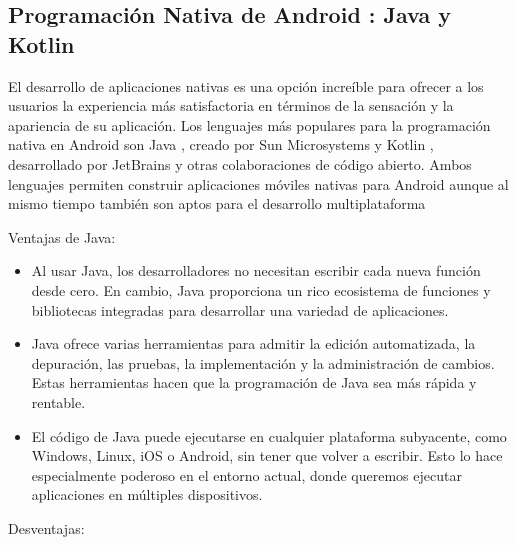\subsection{Programación Nativa de Android : Java y Kotlin}\label{chapter:introduction}

El desarrollo de aplicaciones nativas es una opción increíble para ofrecer a los usuarios la experiencia más satisfactoria en términos de la sensación y la apariencia de su aplicación. Los lenguajes más populares para la programación nativa en Android son Java , creado por Sun Microsystems y Kotlin , desarrollado por JetBrains y otras colaboraciones de código abierto. Ambos lenguajes permiten construir aplicaciones móviles nativas para Android aunque al mismo tiempo también son aptos para el desarrollo multiplataforma

Ventajas de Java:

\begin{itemize}
\item Al usar Java, los desarrolladores no necesitan escribir cada nueva función desde cero. En cambio, Java proporciona un rico ecosistema de funciones y bibliotecas integradas para desarrollar una variedad de aplicaciones. 

\item Java ofrece varias herramientas para admitir la edición automatizada, la depuración, las pruebas, la implementación y la administración de cambios. Estas herramientas hacen que la programación de Java sea más rápida y rentable.

\item El código de Java puede ejecutarse en cualquier plataforma subyacente, como Windows, Linux, iOS o Android, sin tener que volver a escribir. Esto lo hace especialmente poderoso en el entorno actual, donde queremos ejecutar aplicaciones en múltiples dispositivos.
\end{itemize}

Desventajas:

